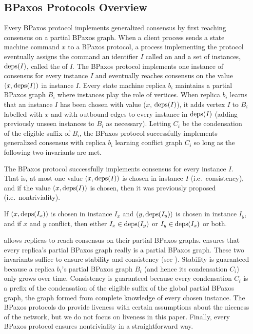 \subsection{BPaxos Protocols Overview}
Every BPaxos protocol implements generalized consensus by first reaching
consensus on a partial BPaxos graph.
%
When a client process sends a state machine command $x$ to a BPaxos protocol, a
process implementing the protocol eventually assigns the command an identifier
$I$ called an  and a set of instances, $\text{deps}(I)$, called the
 of $I$.
%
The BPaxos protocol implements one instance of consensus for every instance $I$
and eventually reaches consensus on the value $(x, \text{deps}(I))$ in instance $I$.
Every state machine replica $b_i$ maintains a partial BPaxos graph $B_i$ where
instances play the role of vertices. When replica $b_i$ learns that an instance
$I$ has been chosen with value ($x$, $\text{deps}(I)$), it adds vertex $I$ to $B_i$
labelled with $x$ and with outbound edges to every instance in $\text{deps}(I)$
(adding previously unseen instances to $B_i$ as necessary). Letting $C_i$ be
the condensation of the eligible suffix of $B_i$, the BPaxos protocol
successfully implements generalized consensus with replica $b_i$ learning
conflict graph $C_i$ so long as the following two invariants are met.

\begin{invariant}
  The BPaxos protocol successfully implements consensus for every instance $I$.
  That is, at most one value $(x, \text{deps}(I))$ is chosen in instance $I$ (i.e.\
  consistency), and if the value $(x, \text{deps}(I))$ is chosen, then it was
  previously proposed (i.e.\ nontriviality).
\end{invariant}%
%
\begin{invariant}
  If $(x, \text{deps}(I_x))$ is chosen in instance $I_x$ and $(y, \text{deps}(I_y))$ is
  chosen in instance $I_y$, and if $x$ and $y$ conflict, then either $I_x \in
  \text{deps}(I_y)$ or $I_y \in \text{deps}(I_x)$ or both.
\end{invariant}

 allows replicas to reach consensus on their partial
BPaxos graphs. \invref{ConflictInvariant} ensures that every replica's partial
BPaxos graph really is a partial BPaxos graph. These two invariants suffice to
ensure stability and consistency (see \secref{GeneralizedConsensus}).
%
Stability is guaranteed because a replica $b_i$'s partial BPaxos graph $B_i$
(and hence its condensation $C_i$) only grows over time.
%
Consistency is guaranteed because every condensation $C_i$ is a prefix of the
condensation of the eligible suffix of the global partial BPaxos graph, the
graph formed from complete knowledge of every chosen instance.
%
The BPaxos protocols do provide liveness with certain assumptions about the
niceness of the network, but we do not focus on liveness in this paper.
%
Finally, every BPaxos protocol ensures nontriviality in a straightforward way.

